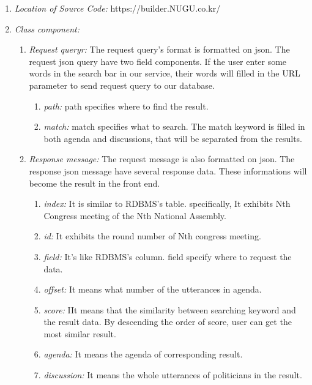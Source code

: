 \documentclass[conference]{IEEEtran}
\begin{document}
\begin{enumerate}
\begin{enumerate}
   \end{enumerate}

  \item \textit{Location of Source Code: } https://builder.NUGU.co.kr/\\

  \item \textit{Class component: }
  \begin{enumerate}
\item \textit {Request queryr: }  The request query’s format is formatted on json. The request json query have two field components. If the user enter some words in the search bar in our service, their words will filled in the URL parameter to send request query to our database.\
\begin{enumerate}
\item \textit {path: }  path specifies where to find the result.\
\item \textit {match: } match specifies what to search. The match keyword  is filled in both agenda and discussions, that will be separated from the results.\
\\
\end{enumerate}


\item \textit {Response message: }  The request message is also formatted on json. The response json message have several response data. These informations will become the result in the front end.
\begin{enumerate}
\item \textit {index: }  It is similar to RDBMS’s table. specifically, It exhibits Nth Congress meeting of the Nth National Assembly.\
\item \textit {id: } It exhibits the round number of Nth congress meeting.\
\item \textit {field: } It’s like RDBMS’s column. field specify where to request the data.\
\item \textit {offset: } It means what number of the utterances in agenda.\
\item \textit {score: } IIt means that the similarity between searching keyword and the result data. By descending the order of score, user can get the most similar result.\
\item \textit {agenda: }  It means the agenda of corresponding result.\
\item \textit {discussion: }It means the whole utterances of politicians in the result.\
\\
\end{enumerate}


\end{enumerate}
\end{enumerate}
\end{document}
